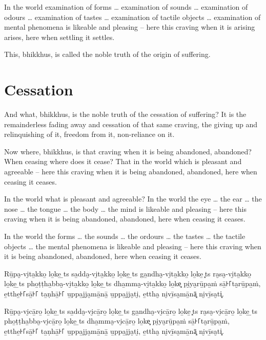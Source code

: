 In the world examination of forms \ldots{} examination of sounds \ldots{}
examination of odours \ldots{} examination of tastes \ldots{} examination of
tactile objects \ldots{} examination of mental phenomena is likeable and
pleasing -- here this craving when it is arising arises, here when settling it
settles.

This, bhikkhus, is called the noble truth of the origin of suffering.

\section{Cessation}

And what, bhikkhus, is the noble truth of the cessation of suffering? It is the
remainderless fading away and cessation of that same craving, the giving up and
relinquishing of it, freedom from it, non-reliance on it.

Now where, bhikkhus, is that craving when it is being abandoned, abandoned? When
ceasing where does it cease? That in the world which is pleasant and agreeable
-- here this craving when it is being abandoned, abandoned, here when ceasing it
ceases.

In the world what is pleasant and agreeable? In the world the eye \ldots{} the
ear \ldots{} the nose \ldots{} the tongue \ldots{} the body \ldots{} the mind is
likeable and pleasing -- here this craving when it is being abandoned, abandoned,
here when ceasing it ceases.

In the world the forms \ldots{} the sounds \ldots{} the ordours \ldots{} the
tastes \ldots{} the tactile objects \ldots{} the mental phenomena is likeable
and pleasing -- here this craving when it is being abandoned, abandoned, here
when ceasing it ceases.

\paliPage

Rū̱pa̮-vi̮ta̱kko̱ lo̱ke̱ \ldo̱ts{} sa̱dda̮-vi̮ta̱kko̱ lo̱ke̱ \ldo̱ts{} ga̱ndha̮-vi̮ta̱kko̱ lo̱ke̱ \ldo͓ts{}
ra̮sa̮-vi̮ta̱kko̱ lo̱ke̱ \ldo̱ts{} pho̱ṭṭha̱bba̮-vi̮ta̱kko̱ lo̱ke̱ \ldo̱ts{} dha̱mma̮-vi̮ta̱kko̱ lo̱ke͓
pi̮ya̮rū̱pa̱ṁ sā̱꜔꜒ta̮rū̱pa̱ṁ, e̱tthe̱꜔꜒sā̱꜔꜒ ta̱ṇhā̱꜔꜒ u̱ppa̱jja̮mā̱nā̱ u̱ppa̱jja̮ti̮, e̱ttha̮ ni̮vī̱sa̮mā̱nā͓
ni̮vī̱sa̮ti͓.

Rū̱pa̮-vi̮cā̱ro̱ lo̱ke̱ \ldo̱ts{} sa̱dda̮-vi̮cā̱ro̱ lo̱ke̱ \ldo̱ts{} ga̱ndha̮-vi̮cā̱ro̱ lo̱ke̱ \ldo͓ts{}
ra̮sa̮-vi̮cā̱ro̱ lo̱ke̱ \ldo̱ts{} pho̱ṭṭha̱bba̮-vi̮cā̱ro̱ lo̱ke̱ \ldo̱ts{} dha̱mma̮-vi̮cā̱ro̱ lo̱ke͓
pi̮ya̮rū̱pa̱ṁ sā̱꜔꜒ta̮rū̱pa̱ṁ, e̱tthe̱꜔꜒sā̱꜔꜒ ta̱ṇhā̱꜔꜒ u̱ppa̱jja̮mā̱nā̱ u̱ppa̱jja̮ti̮, e̱ttha̮ ni̮vī̱sa̮mā̱nā͓
ni̮vī̱sa̮ti͓.


